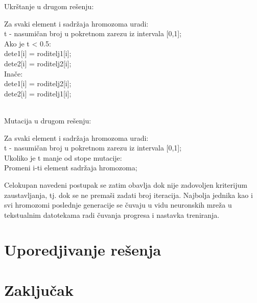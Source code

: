 \documentclass[a4paper]{article}
\begin{document}
\begin{tcolorbox}
\begin{center}
Ukrštanje u drugom rešenju: \\
\end{center}
Za svaki element i sadržaja hromozoma uradi:\\
\hphantom{tcolorbox}t - nasumičan broj u pokretnom zarezu iz intervala [0,1];\\
\hphantom{tcolorbox}Ako je t < 0.5: \\
\hphantom{tcolorbox}\hphantom{tcolorbox}dete1[i] = roditelj1[i]; \\
\hphantom{tcolorbox}\hphantom{tcolorbox}dete2[i] = roditelj2[i]; \\
\hphantom{tcolorbox}Inače: \\
\hphantom{tcolorbox}\hphantom{tcolorbox}dete1[i] =  roditelj2[i]; \\
\hphantom{tcolorbox}\hphantom{tcolorbox}dete2[i] =  roditelj1[i]; \\~\\
\begin{center}
Mutacija u drugom rešenju:  \\
\end{center}
Za svaki element i sadržaja hromozoma uradi:\\
\hphantom{tcolorbox}t - nasumičan broj u pokretnom zarezu iz intervala [0,1];\\
\hphantom{tcolorbox}Ukoliko je t manje od stope mutacije: \\
\hphantom{tcolorbox}\hphantom{tcolorbox}Promeni i-ti element sadržaja hromozoma;
\end{tcolorbox}

\par Celokupan navedeni postupak se zatim obavlja dok nije zadovoljen kriterijum zaustavljanja, tj. dok se ne premaši zadati broj iteracija. Najbolja jednika kao i svi hromozomi poslednje generacije se čuvaju u vidu neuronskih mreža u tekstualnim datotekama radi čuvanja progresa i nastavka treniranja.

\section{Uporedjivanje rešenja}
\label{sec:uporedjivanjeResenja}




 \newpage
\section{Zaključak}
\label{sec:zakljucak}


 

\end{document}
